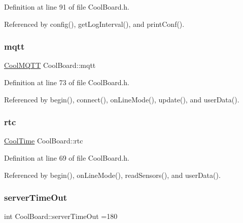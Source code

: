 Definition at line 91 of file Cool\+Board.\+h.



Referenced by config(), get\+Log\+Interval(), and print\+Conf().

\mbox{\label{classCoolBoard_a2399f44d7c23c1149a335cb3b46d90f1}} 
\subsubsection{\texorpdfstring{mqtt}{mqtt}}
{\footnotesize\ttfamily \hyperlink{classCoolMQTT}{Cool\+M\+Q\+TT} Cool\+Board\+::mqtt\hspace{0.3cm}{\ttfamily [private]}}



Definition at line 73 of file Cool\+Board.\+h.



Referenced by begin(), connect(), on\+Line\+Mode(), update(), and user\+Data().

\mbox{\label{classCoolBoard_a50d2a6716879d64a85f3c6b44ad63275}} 
\subsubsection{\texorpdfstring{rtc}{rtc}}
{\footnotesize\ttfamily \hyperlink{classCoolTime}{Cool\+Time} Cool\+Board\+::rtc\hspace{0.3cm}{\ttfamily [private]}}



Definition at line 69 of file Cool\+Board.\+h.



Referenced by begin(), on\+Line\+Mode(), read\+Sensors(), and user\+Data().

\mbox{\label{classCoolBoard_a7a8d8d3d316220cdd049cd63c1aa8fe6}} 
\subsubsection{\texorpdfstring{server\+Time\+Out}{serverTimeOut}}
{\footnotesize\ttfamily int Cool\+Board\+::server\+Time\+Out =180\hspace{0.3cm}{\ttfamily [private]}}



